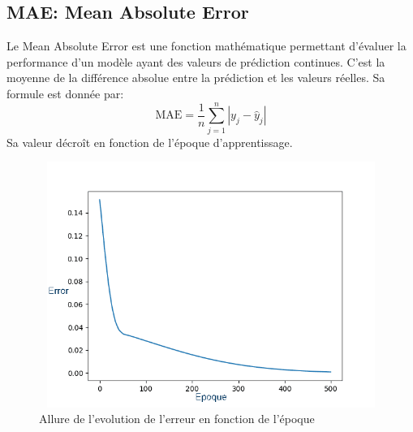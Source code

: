 \subsection{MAE: Mean Absolute Error}
Le Mean Absolute Error est une fonction mathématique permettant d’évaluer la performance d’un modèle ayant des valeurs de prédiction continues. 
C’est la moyenne de la différence absolue entre la prédiction et les valeurs réelles.
Sa formule est donnée par:
$$\mathrm{MAE}=\frac{1}{n} \sum_{j=1}^n\left|y_j-\hat{y}_j\right|
$$
Sa valeur décroît en fonction de l'époque d’apprentissage.
\begin{figure}[h]
\begin{center}
\includegraphics[width=15cm,height=8cm]{images/error_evaluation.png}
\caption[Allure de l'evolution de l'erreur en fonction de l'époque]{Allure de l'evolution de l'erreur en fonction de l'époque}
\label{monlabel}
\end{center}
\end{figure}





